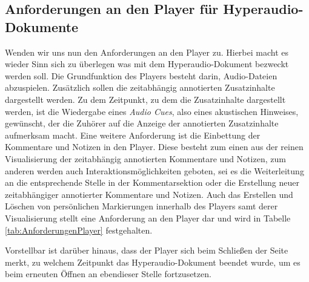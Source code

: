 \subsection{Anforderungen an den Player für Hyperaudio-Dokumente}
Wenden wir uns nun den Anforderungen an den Player zu. Hierbei macht es wieder Sinn sich zu überlegen was mit dem Hyperaudio-Dokument bezweckt werden soll. Die Grundfunktion des Players besteht darin, Audio-Dateien abzuspielen. Zusätzlich sollen die zeitabhängig annotierten Zusatzinhalte dargestellt werden. Zu dem Zeitpunkt, zu dem die Zusatzinhalte dargestellt werden, ist die Wiedergabe eines \textit{Audio Cues}, also eines akustischen Hinweises, gewünscht, der die Zuhörer auf die Anzeige der annotierten Zusatzinhalte aufmerksam macht. Eine weitere Anforderung ist die Einbettung der Kommentare und Notizen in den Player. Diese besteht zum einen aus der reinen Visualisierung der zeitabhängig annotierten Kommentare und Notizen, zum anderen werden auch Interaktionsmöglichkeiten geboten, sei es die Weiterleitung an die entsprechende Stelle in der Kommentarsektion oder die Erstellung neuer zeitabhängiger annotierter Kommentare und Notizen.  Auch das Erstellen und Löschen von persönlichen Markierungen innerhalb des Players samt derer Visualisierung stellt eine Anforderung an den Player dar und wird in Tabelle \ref{tab:AnforderungenPlayer} festgehalten.

Vorstellbar ist darüber hinaus, dass der Player sich beim Schließen der Seite merkt, zu welchem Zeitpunkt das Hyperaudio-Dokument beendet wurde, um es beim erneuten Öffnen an ebendieser Stelle fortzusetzen.

